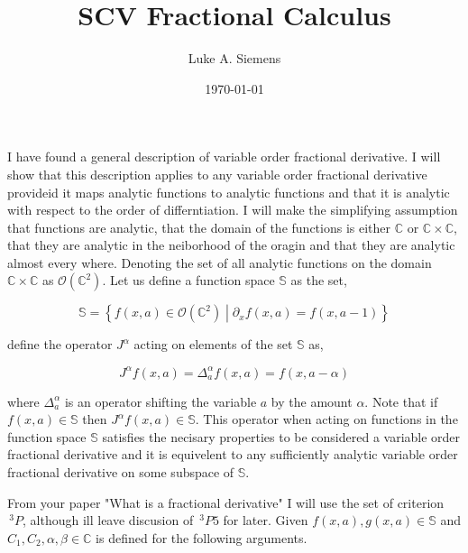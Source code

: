 \documentclass[%
 onecolumn,
 amsmath, amssymb, aps, pra, 10pt
]{revtex4-2}
\begin{document}
\title{SCV Fractional Calculus}%
\author{Luke A. Siemens}
\noaffiliation
\date{\today}
\maketitle

I have found a general description of variable order fractional derivative. I will show that this description applies to any variable order fractional derivative provideid it maps analytic functions to analytic functions and that it is analytic with respect to the order of differntiation. I will make the simplifying assumption that functions are analytic, that the domain of the functions is either $\mathbb{C}$ or $\mathbb{C} \times \mathbb{C}$, that they are analytic in the neiborhood of the oragin and that they are analytic almost every where. Denoting the set of all analytic functions on the domain $\mathbb{C} \times \mathbb{C}$ as $\mathcal{O}(\mathbb{C}^2)$. Let us define a function space $\mathbb{S}$ as the set,

\begin{equation}
\mathbb{S} = \left\lbrace f(x, a) \in \mathcal{O}(\mathbb{C}^2) \middle| \partial_x f(x, a) = f(x, a - 1) \right\rbrace
\label{differentiable_set}
\end{equation}

define the operator $J^{\alpha}$ acting on elements of the set $\mathbb{S}$ as,

\begin{equation}
J^{\alpha} f(x, a) = \Delta_{a}^{\alpha} f(x, a) = f(x, a - \alpha)
\label{fractional_derivative}
\end{equation}

where $\Delta_{a}^{\alpha}$ is an operator shifting the variable $a$ by the amount $\alpha$. Note that if $f(x, a) \in \mathbb{S}$ then $J^{\alpha} f(x, a) \in \mathbb{S}$. This operator when acting on functions in the function space $\mathbb{S}$ satisfies the necisary properties to be considered a variable order fractional derivative and it is equivelent to any sufficiently analytic variable order fractional derivative on some subspace of $\mathbb{S}$.

From your paper "What is a fractional derivative" I will use the set of criterion $\,^3P$, although ill leave discusion of $\,^3P5$ for later. Given $f(x, a), g(x, a) \in \mathbb{S}$ and $C_1, C_2, \alpha, \beta \in \mathbb{C}$ is defined for the following arguments.
\end{document}
